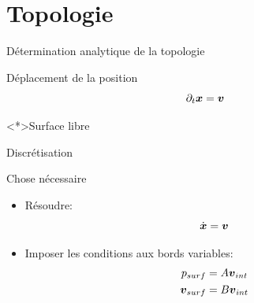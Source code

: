 \section{Topologie}
\begin{frame}[<+->]{Détermination analytique de la topologie}

\begin{block}{Déplacement de la position}
 \begin{equation*}
  \partial_t{\boldsymbol {x}}={\boldsymbol {v}}
 \end{equation*}
\end{block}

\begin{block}<*>{Surface libre}
\end{block}
 
\end{frame}

\begin{frame}[<+->]{Discrétisation}

\begin{block}{Chose nécessaire}
 \begin{itemize}
  \item<0-> Résoudre:
  \begin{equation*}
   \dot{{\boldsymbol {x}}}={\boldsymbol {v}}
  \end{equation*}
  \item Imposer les conditions aux bords variables:
   \begin{align*}
 p_{surf}&=A{\boldsymbol {v}}_{int}\\
 {\boldsymbol {v}}_{surf}&=B{\boldsymbol {v}}_{int}
\end{align*}
 \end{itemize}
 \end{block}

\end{frame}

